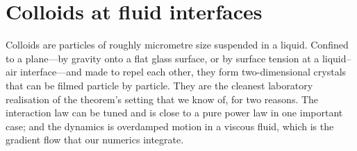 \section{Colloids at fluid interfaces}\label{sec:ch4-colloids}

Colloids are particles of roughly micrometre size suspended in a liquid. Confined to a plane---by gravity onto a
flat glass surface, or by surface tension at a liquid--air interface---and made to repel each other, they form
two-dimensional crystals that can be filmed particle by particle. They are the cleanest laboratory realisation of
the theorem's setting that we know of, for two reasons. The interaction law can be tuned and is close to a pure
power law in one important case; and the dynamics is overdamped motion in a viscous fluid, which is the gradient
flow that our numerics integrate.


